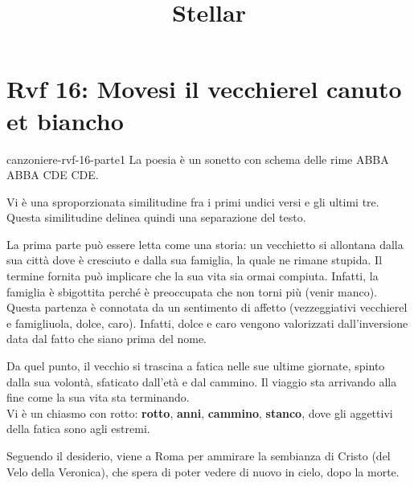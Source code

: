 \documentclass[preview]{standalone}
\begin{document}
\title{Stellar}
\genpage

\section{Rvf 16: Movesi il vecchierel canuto et biancho}

\begin{snippet}{canzoniere-rvf-16-parte1}
    La poesia è un sonetto con schema delle rime ABBA ABBA CDE CDE.


    Vi è una sproporzionata similitudine fra i primi undici versi e gli ultimi tre.
    Questa similitudine delinea quindi una separazione del testo.

    La prima parte può essere letta come una storia: un vecchietto si allontana
    dalla sua città dove è cresciuto e dalla sua famiglia, la quale ne rimane stupida.
    Il termine fornita può implicare che la sua vita sia ormai compiuta.
    Infatti, la famiglia è sbigottita perché è preoccupata che non torni più (venir manco).
    Questa partenza è connotata da un sentimento di affetto (vezzeggiativi vecchierel e famigliuola, dolce, caro).
    Infatti, dolce e caro vengono valorizzati dall'inversione data dal fatto che siano prima del nome.

    Da quel punto, il vecchio si trascina a fatica nelle sue ultime giornate,
    spinto dalla sua volontà, sfaticato dall'età e dal cammino.
    Il viaggio sta arrivando alla fine come la sua vita sta terminando.\\
    Vi è un chiasmo con rotto: \textbf{rotto}, \textbf{anni}, \textbf{cammino}, \textbf{stanco},
    dove gli aggettivi della fatica sono agli estremi.

    Seguendo il desiderio, viene a Roma per ammirare la sembianza di Cristo (del Velo della Veronica),
    che spera di poter vedere di nuovo in cielo, dopo la morte.
\end{snippet}
\end{document}
